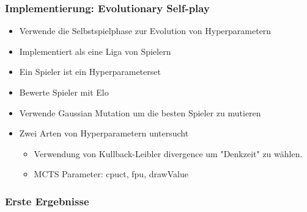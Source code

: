 \begin{frame}
 \frametitle{Implementierung: Evolutionary Self-play}
  


\begin{itemize}
  \item \pause Verwende die Selbstspielphase zur Evolution von Hyperparametern
  \item \pause Implementiert als eine Liga von Spielern
  \item \pause Ein Spieler ist ein Hyperparameterset
  \item \pause Bewerte Spieler mit Elo
  \item \pause Verwende Gaussian Mutation um die besten Spieler zu mutieren
\end{itemize}

\begin{itemize}
  \item \pause Zwei Arten von Hyperparametern untersucht
\begin{itemize}
  \item \pause Verwendung von Kullback-Leibler divergence um "Denkzeit" zu wählen.
  \item \pause MCTS Parameter: cpuct, fpu, drawValue
\end{itemize}
\end{itemize}

  
\end{frame}
\begin{frame}
 \frametitle{Erste Ergebnisse}
  



  
\end{frame}
